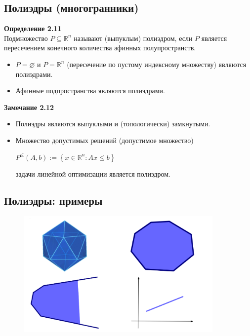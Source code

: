 \subsection{Полиэдры (многогранники)}
\textbf{Определение 2.11}\\
Подмножество $P\subseteq \mathbb{R}^n$ называют (выпуклым) полиэдром, если $P$ является пересечением конечного количества афинных полупространств.
\begin{itemize}
    \item $P = \varnothing$ и $P = \mathbb{R}^n$ (пересечение по пустому индексному множеству) являются полиэдрами.
\end{itemize}
\begin{itemize}
    \item Афинные подпространства являются полиэдрами.
\end{itemize}
\textbf{Замечание 2.12}
\begin{itemize}
    \item Полиэдры являются выпуклыми и (топологически) замкнутыми.
\end{itemize}
\begin{itemize}
    \item Множество допустимых решений (допустимое множество)
\begin{center}
\textbf{$P^\leq(A,b):= \left \{ x\in\mathbb{R}^n:  Ax  \leq b \right \}$}\\
\end{center}
задачи линейной оптимизации является полиэдром.
\end{itemize}

\newpage
\subsection{Полиэдры: примеры}
\begin{figure}[h!]
\centering
\includegraphics[width=0.9\textwidth]{800px-Polyeder}
\label{fig:}
\end{figure}

